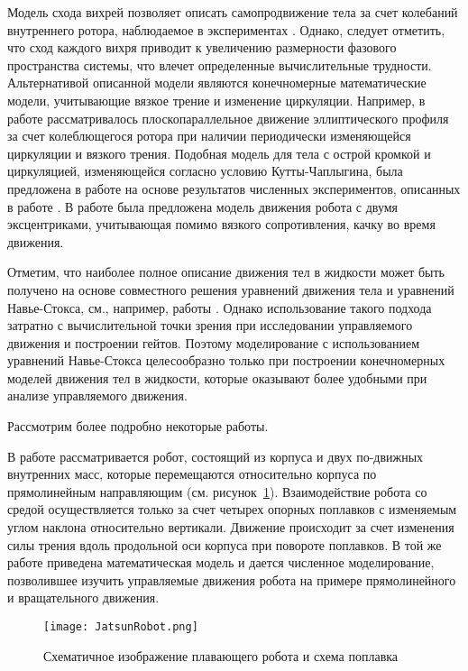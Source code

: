 Модель схода вихрей позволяет описать самопродвижение тела за счет колебаний внутреннего ротора, наблюдаемое в экспериментах \cite{Tallapragada_2015, Pollard_Tallapragada_2019}. Однако, следует отметить, что сход каждого вихря приводит к увеличению размерности фазового пространства системы, что влечет определенные вычислительные трудности. Альтернативой описанной модели являются конечномерные математические модели, учитывающие вязкое трение и изменение циркуляции. Например, в работе \cite{Borisov_et_al_2018} рассматривалось плоскопараллельное движение эллиптического профиля за счет колеблющегося ротора при наличии периодически изменяющейся циркуляции и вязкого трения. Подобная модель для тела с острой кромкой и циркуляцией, изменяющейся согласно условию Кутты-Чаплыгина, была предложена в работе \cite{Mamaev_Vetchanin_2018} на основе результатов численных экспериментов, описанных в работе \cite{Mamaev_et_al_2018}. В работе \cite{Kilin_et_al_2018} была предложена модель движения робота с двумя эксцентриками, учитывающая помимо вязкого сопротивления, качку во время движения.

Отметим, что наиболее полное описание движения тел в жидкости может быть получено на основе совместного решения уравнений движения тела и уравнений Навье-Стокса, см., например, работы \cite{Childress_et_al_2011, Eldredge_2006, Vetchanin_et_al_2013}. Однако использование такого подхода затратно с вычислительной точки зрения при исследовании управляемого движения и построении гейтов. Поэтому моделирование с использованием уравнений Навье-Стокса целесообразно только при построении конечномерных моделей движения тел в жидкости, которые оказывают более удобными при анализе управляемого движения.




Рассмотрим более подробно некоторые работы.

В работе \cite{Volkova_Jatsun} рассматривается робот, состоящий из корпуса и двух по-движных внутренних масс, которые перемещаются относительно корпуса по прямолинейным направляющим (см. рисунок~\ref{JatsunRobot}). Взаимодействие робота со средой осуществляется только за счет четырех опорных поплавков с изменяемым углом наклона относительно вертикали. Движение происходит за счет изменения силы трения вдоль продольной оси корпуса при повороте поплавков. В той же работе приведена математическая модель и дается численное моделирование, позволившее изучить управляемые движения робота на примере прямолинейного и вращательного движения.

\begin{figure}[h]
	\centering
	\texttt{[image: JatsunRobot.png]}%
	\caption{Схематичное изображение плавающего робота и схема поплавка}
	\label{JatsunRobot}
\end{figure}

